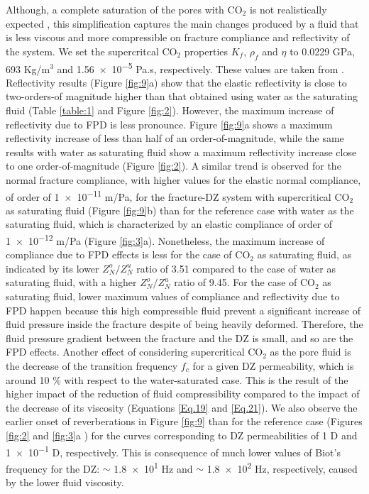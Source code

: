 \documentclass[draft]{agujournal2019}
\begin{document}
Although, a complete saturation of the pores with CO$_2$ is not realistically expected \cite{Chadwick2005,Chadwick2010}, this simplification captures the main changes produced by a fluid that is less viscous and more compressible on fracture compliance and reflectivity of the system. 
We set the supercritcal CO$_2$ properties $K_f$, $\rho_f$ and $\eta$ to 0.0229 GPa, 693 Kg/m$^3$ and \num{1.56e-5} Pa.s, respectively. These values are taken from . 
Reflectivity results (Figure \ref{fig:9}a) show that the elastic reflectivity  is close to two-orders-of magnitude higher than that obtained using water as the saturating fluid (Table \ref{table:1} and Figure \ref{fig:2}). However, the maximum increase of reflectivity due to FPD  is less pronounce. Figure \ref{fig:9}a shows a maximum reflectivity increase of less than half of an order-of-magnitude, while the same results with water as saturating fluid show a maximum reflectivity increase close to one order-of-magnitude (Figure \ref{fig:2}).
A similar trend is observed for the normal fracture compliance, with  higher values for the elastic normal compliance, of order of \num{1e-11} m/Pa, for the fracture-DZ system with supercritical CO$_2$ as saturating fluid (Figure \ref{fig:9}b) than for the reference case with water as the saturating fluid, which is characterized by an elastic compliance of order of \num{1e-12} m/Pa (Figure \ref{fig:3}a). Nonetheless, the maximum increase of compliance due to FPD effects is less for the case of CO$_2$ as saturating fluid, as indicated by its lower  $Z_N^o/Z_N^u$ ratio of 3.51 compared to the case of  water as  saturating fluid, with a higher $Z_N^o/Z_N^u$ ratio of 9.45.
For the case of CO$_2$ as saturating fluid, lower maximum values of compliance and reflectivity due to FPD happen because this high compressible fluid prevent a significant increase of fluid pressure inside the fracture despite of being heavily deformed. Therefore, the fluid pressure gradient between the fracture and the DZ is small, and so are the FPD effects.
Another effect of considering supercritical CO$_2$ as the pore fluid is the decrease of the transition frequency $f_c$ for a given DZ permeability, which is around 10 \% with respect to the water-saturated case. This is the result of the higher impact of the reduction of  fluid compressibility compared to the impact of the decrease of its viscosity (Equations \ref{Eq.19} and \ref{Eq.21}). We also observe the earlier onset of reverberations in Figure \ref{fig:9} than for the reference case (Figures \ref{fig:2} and \ref{fig:3}a ) for the curves corresponding to DZ permeabilities of 1 D and \num{1 e-1} D, respectively. This is consequence of much lower values of Biot's frequency for the DZ: $\sim$ \num{1.8e1} Hz and $\sim$ \num{1.8e2} Hz, respectively, caused by the lower fluid viscosity.
\end{document}
